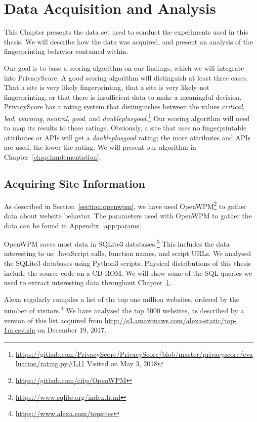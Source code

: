 \documentclass[
    fontsize=12pt,
    headings=small,
    parskip=half,
    bibliography=totoc,
    numbers=noenddot,
    open=any
    ]{scrreprt}
\begin{document}
\chapter{Data Acquisition and Analysis}
\label{chap:data_acquisition}
This Chapter presents the data set used to conduct the experiments used in this thesis.
We will describe how the data was acquired, and present an analysis of the fingerprinting
behavior contained within.

Our goal is to base a scoring algorithm on our findings, which we will integrate into PrivacyScore.
A good scoring algorithm will distinguish at least three cases. That a site is very likely fingerprinting,
that a site is very likely not fingerprinting, or that there is insufficient data to make a meaningful decision.
PrivacyScore has a rating system that distinguishes between the values
\textit{critical}, \textit{bad}, \textit{warning}, \textit{neutral}, \textit{good},
and \textit{doubleplusgood}.\footnote{\url{https://github.com/PrivacyScore/PrivacyScore/blob/master/privacyscore/evaluation/rating.py\#L11} Visited on May 3, 2018}
Our scoring algorithm will need to map its results to these ratings. Obviously, a site that uses no fingerprintable
attributes or APIs will get a \textit{doubleplusgood} rating; the more attributes and APIs are used, the lower the rating.
We will present our algorithm in Chapter~\ref{chap:implementation}.

\section{Acquiring Site Information}
As described in Section~\ref{section:openwpm}, we have used OpenWPM\footnote{\url{https://github.com/citp/OpenWPM}} to gather data about
website behavior.
The parameters used with OpenWPM to gather the data can be found in Appendix~\ref{app:params}.

OpenWPM saves most data in SQLite3 databases.\footnote{\url{https://www.sqlite.org/index.html}}
This includes the data interesting to us: JavaScript calls, function names, and script URLs.
We analysed the SQLite3 databases using Python3 scripts.
Physical distributions of this thesis include the source code on a CD-ROM.
We will show some of the SQL queries we used to extract interesting data throughout Chapter~\ref{chap:data_acquisition}.

Alexa regularly compiles a list of the top one million websites, ordered by the number of
visitors.\footnote{\url{https://www.alexa.com/topsites}}
We have analysed the top 5000 websites, as described by a version of this list acquired from
\url{http://s3.amazonaws.com/alexa-static/top-1m.csv.zip} on December 19, 2017.
\end{document}
